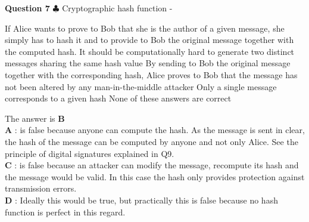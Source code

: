\documentclass[en]{sourcefiles/eplexam}
\newcounter{choice}
\renewcommand\thechoice{\textbf{\Alph{choice}}}
\newcommand\choicelabel{\thechoice$\quad$}
\newenvironment{choices}%
  {\list{\choicelabel}%
     {\usecounter{choice}\def\makelabel##1{\hss\llap{##1}}%
       \settowidth{\leftmargin}{W.\hskip\labelsep\hskip 2.5em}%
       \def\choice{%
         \item
       } %
       \labelwidth\leftmargin\advance\labelwidth-\labelsep
       \topsep=0pt
       \partopsep=0pt
     }%
  }%
  {\endlist}
\begin{document}
\textbf{Question 7} $\clubsuit$ Cryptographic hash function
\begin{choices}
     \choice If Alice wants to prove to Bob that she is the author of a given message, she simply has to hash it and to provide to Bob the original message together with the computed hash. 
     \choice It should be computationally hard to generate two distinct messages sharing the same hash value
     \choice By sending to Bob the original message together with the corresponding hash, Alice proves to Bob that the message has not been altered by any man-in-the-middle attacker
     \choice Only a single message corresponds to a given hash
     \choice None of these answers are correct
\end{choices}
\begin{solution}
The answer is \textbf{B}\\
\noindent \textbf{A} : is false because anyone can compute the hash. As the message is sent in clear, the hash of the message can be computed by anyone and not only Alice. See the principle of digital signatures explained in Q9.\\

\noindent \textbf{C} : is false because an attacker can modify the message, recompute its hash and the message would be valid. In this case the hash only provides protection against transmission errors.\\

\noindent \textbf{D} : Ideally this would be true, but practically this is false because no hash function is perfect in this regard.
\end{solution}
\end{document}
